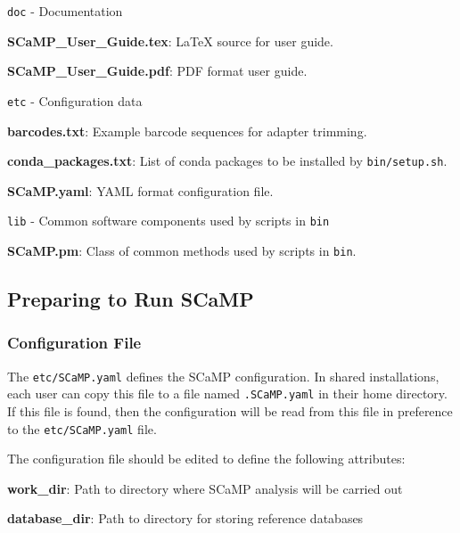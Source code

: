 \documentclass[a4paper,10pt]{article}
\newenvironment{tight_itemize}{
\begin{itemize}
  \setlength{\itemsep}{0pt}
  \setlength{\parskip}{0pt}
}{\end{itemize}}
\begin{document}
{\tt doc} - Documentation
\begin{tight_itemize}
\item \textbf{SCaMP\_User\_Guide.tex}: LaTeX source for user guide.
\item \textbf{SCaMP\_User\_Guide.pdf}: PDF format user guide.
\end{tight_itemize}

{\tt etc} - Configuration data
\begin{tight_itemize}
\item \textbf{barcodes.txt}: Example barcode sequences for adapter trimming.
\item \textbf{conda\_packages.txt}: List of conda packages to be installed by {\tt bin/setup.sh}.
\item \textbf{SCaMP.yaml}: YAML format configuration file.
\end{tight_itemize}

{\tt lib} - Common software components used by scripts in {\tt bin}
\begin{tight_itemize}
\item \textbf{SCaMP.pm}: Class of common methods used by scripts in {\tt bin}.
\end{tight_itemize}

\subsection{Preparing to Run SCaMP}

\subsubsection{Configuration File}

The {\tt etc/SCaMP.yaml} defines the SCaMP configuration. In shared
installations, each user can copy this file to a file named {\tt .SCaMP.yaml}
in their home directory. If this file is found, then the configuration will be
read from this file in preference to the {\tt etc/SCaMP.yaml} file.

The configuration file should be edited to define the following attributes:

\begin{tight_itemize}
\item \textbf{work\_dir}: Path to directory where SCaMP analysis will be carried out
\item \textbf{database\_dir}: Path to directory for storing reference databases
\end{tight_itemize}
\end{document}
